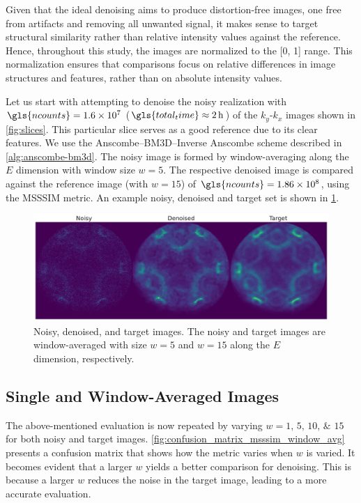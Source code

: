 Given that the ideal denoising aims to produce distortion-free images, one free from artifacts and removing all unwanted signal, it makes sense to target structural similarity rather than relative intensity values against the reference. Hence, throughout this study, the images are normalized to the [\num{0}, \num{1}] range. This normalization ensures that comparisons focus on relative differences in image structures and features, rather than on absolute intensity values.

Let us start with attempting to denoise the noisy realization with $\gls{ncounts}=\num{1.6e7}$ ($\gls{total_time}\approx\qty{2}{h}$) of the $k_y$-$k_x$ images shown in \cref{fig:slices}. This particular slice serves as a good reference due to its clear features. We use the Anscombe--\gls{BM3D}--Inverse Anscombe scheme described in \cref{alg:anscombe-bm3d}. The noisy image is formed by window-averaging along the $E$ dimension with window size $w = 5$. The respective denoised image is compared against the reference image (with $w=15$) of $\gls{ncounts}=\num{1.86e8}$, using the \gls{MSSSIM} metric. An example noisy, denoised and target set is shown in \cref{fig:noisy-denoised-ref-16M-avg-bm3d}. 

\begin{figure}
    \centering
    \includegraphics[width=1\linewidth]{images/noisy_denoised_ref_16M_avg_bm3d.pdf}
    \caption{Noisy, denoised, and target images. The noisy and target images are window-averaged with size $w=5$ and $w=15$ along the $E$ dimension, respectively.}
    \label{fig:noisy-denoised-ref-16M-avg-bm3d}
\end{figure}

\subsection{Single and Window-Averaged Images}
The above-mentioned evaluation is now repeated by varying $w = \numlist{1;5;10;15}$ for both noisy and target images. \cref{fig:confusion_matrix_msssim_window_avg} presents a confusion matrix that shows how the metric varies when $w$ is varied. It becomes evident that a larger $w$ yields a better comparison for denoising. This is because a larger $w$ reduces the noise in the target image, leading to a more accurate evaluation.

